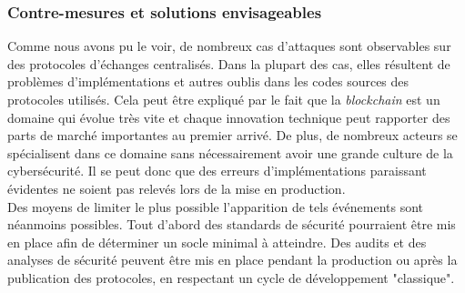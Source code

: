 \subsubsection{Contre-mesures et solutions envisageables}
Comme nous avons pu le voir, de nombreux cas d'attaques sont observables sur des protocoles d'échanges centralisés. 
Dans la plupart des cas, elles résultent de problèmes d'implémentations et autres oublis dans les codes sources des protocoles utilisés. 
Cela peut être expliqué par le fait que la \textit{\gls{blockchain}} est un domaine qui évolue très vite et chaque innovation technique peut rapporter des parts de marché importantes au premier arrivé. 
De plus, de nombreux acteurs se spécialisent dans ce domaine sans nécessairement avoir une grande culture de la cybersécurité.
Il se peut donc que des erreurs d'implémentations paraissant évidentes ne soient pas relevés lors de la mise en production. \\ 
Des moyens de limiter le plus possible l'apparition de tels événements sont néanmoins possibles. 
Tout d'abord des standards de sécurité pourraient être mis en place afin de déterminer un socle minimal à atteindre. 
Des audits et des analyses de sécurité peuvent être mis en place pendant la production ou après la publication des protocoles, en respectant un cycle de développement "classique".
